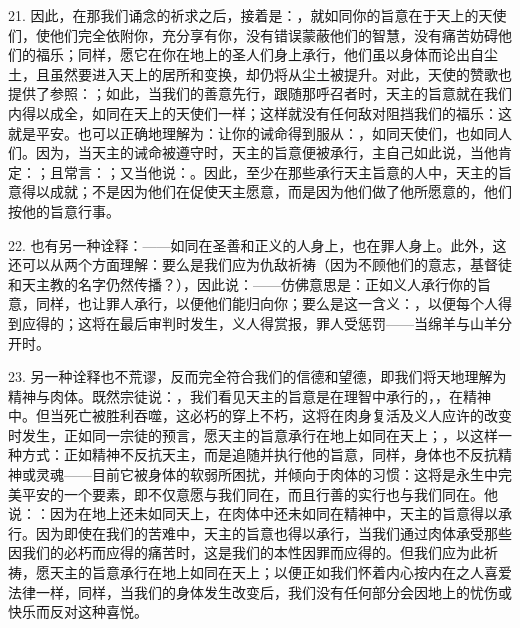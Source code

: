 21. 因此，在那我们诵念的祈求之后，接着是：，就如同你的旨意在于天上的天使们，使他们完全依附你，充分享有你，没有错误蒙蔽他们的智慧，没有痛苦妨碍他们的福乐；同样，愿它在你在地上的圣人们身上承行，他们虽以身体而论出自尘土，且虽然要进入天上的居所和变换，却仍将从尘土被提升。对此，天使的赞歌也提供了参照：；如此，当我们的善意先行，跟随那呼召者时，天主的旨意就在我们内得以成全，如同在天上的天使们一样；这样就没有任何敌对阻挡我们的福乐：这就是平安。也可以正确地理解为：让你的诫命得到服从：，如同天使们，也如同人们。因为，当天主的诫命被遵守时，天主的旨意便被承行，主自己如此说，当他肯定：；且常言：；又当他说：。因此，至少在那些承行天主旨意的人中，天主的旨意得以成就；不是因为他们在促使天主愿意，而是因为他们做了他所愿意的，他们按他的旨意行事。\par

22. 也有另一种诠释：——如同在圣善和正义的人身上，也在罪人身上。此外，这还可以从两个方面理解：要么是我们应为仇敌祈祷（因为不顾他们的意志，基督徒和天主教的名字仍然传播？），因此说：——仿佛意思是：正如义人承行你的旨意，同样，也让罪人承行，以便他们能归向你；要么是这一含义：，以便每个人得到应得的；这将在最后审判时发生，义人得赏报，罪人受惩罚——当绵羊与山羊分开时。\par

23. 另一种诠释也不荒谬，反而完全符合我们的信德和望德，即我们将天地理解为精神与肉体。既然宗徒说：，我们看见天主的旨意是在理智中承行的，，在精神中。但当死亡被胜利吞噬，这必朽的穿上不朽，这将在肉身复活及义人应许的改变时发生，正如同一宗徒的预言，愿天主的旨意承行在地上如同在天上；，以这样一种方式：正如精神不反抗天主，而是追随并执行他的旨意，同样，身体也不反抗精神或灵魂——目前它被身体的软弱所困扰，并倾向于肉体的习惯：这将是永生中完美平安的一个要素，即不仅意愿与我们同在，而且行善的实行也与我们同在。他说：：因为在地上还未如同天上，在肉体中还未如同在精神中，天主的旨意得以承行。因为即使在我们的苦难中，天主的旨意也得以承行，当我们通过肉体承受那些因我们的必朽而应得的痛苦时，这是我们的本性因罪而应得的。但我们应为此祈祷，愿天主的旨意承行在地上如同在天上；以便正如我们怀着内心按内在之人喜爱法律一样，同样，当我们的身体发生改变后，我们没有任何部分会因地上的忧伤或快乐而反对这种喜悦。\par

